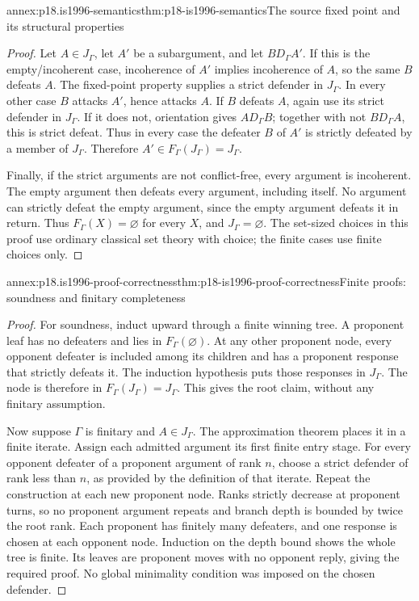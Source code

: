 \begin{annexitem}{annex:p18.is1996-semantics}{thm:p18-is1996-semantics}{The source fixed point and its structural properties}
\begin{proof}
Let \(A\in J_\Gamma\), let \(A'\) be a subargument, and
let \(B D_\Gamma A'\).
If this is the empty/incoherent case, incoherence of \(A'\)
implies incoherence of \(A\), so the same \(B\) defeats \(A\).
The fixed-point property supplies a strict defender in \(J_\Gamma\).
In every other case \(B\) attacks \(A'\), hence attacks \(A\).
If \(B\) defeats \(A\), again use its strict defender in
\(J_\Gamma\).
If it does not, orientation gives \(A D_\Gamma B\);
together with not \(B D_\Gamma A\), this is strict defeat.
Thus in every case the defeater \(B\) of \(A'\) is strictly
defeated by a member of \(J_\Gamma\).
Therefore \(A'\in F_\Gamma(J_\Gamma)=J_\Gamma\).

Finally, if the strict arguments are not conflict-free,
every argument is incoherent. The empty argument then
defeats every argument, including itself.
No argument can strictly defeat the empty argument,
since the empty argument defeats it in return.
Thus \(F_\Gamma(X)=\varnothing\) for every \(X\), and
\(J_\Gamma=\varnothing\).
The set-sized choices in this proof use ordinary classical
set theory with choice; the finite cases use finite choices only.
\end{proof}
\end{annexitem}

\begin{annexitem}{annex:p18.is1996-proof-correctness}{thm:p18-is1996-proof-correctness}{Finite proofs: soundness and finitary completeness}
\begin{proof}
For soundness, induct upward through a finite winning tree.
A proponent leaf has no defeaters and lies in
\(F_\Gamma(\varnothing)\).
At any other proponent node, every opponent defeater is
included among its children and has a proponent response
that strictly defeats it. The induction hypothesis puts
those responses in \(J_\Gamma\).
The node is therefore in \(F_\Gamma(J_\Gamma)=J_\Gamma\).
This gives the root claim, without any finitary assumption.

Now suppose \(\Gamma\) is finitary and \(A\in J_\Gamma\).
The approximation theorem places it in a finite iterate.
Assign each admitted argument its first finite entry stage.
For every opponent defeater of a proponent argument of rank \(n\),
choose a strict defender of rank less than \(n\), as provided
by the definition of that iterate.
Repeat the construction at each new proponent node.
Ranks strictly decrease at proponent turns, so no proponent
argument repeats and branch depth is bounded by twice the
root rank. Each proponent has finitely many defeaters,
and one response is chosen at each opponent node.
Induction on the depth bound shows the whole tree is finite.
Its leaves are proponent moves with no opponent reply,
giving the required proof.
No global minimality condition was imposed on the chosen defender.
\end{proof}
\end{annexitem}

